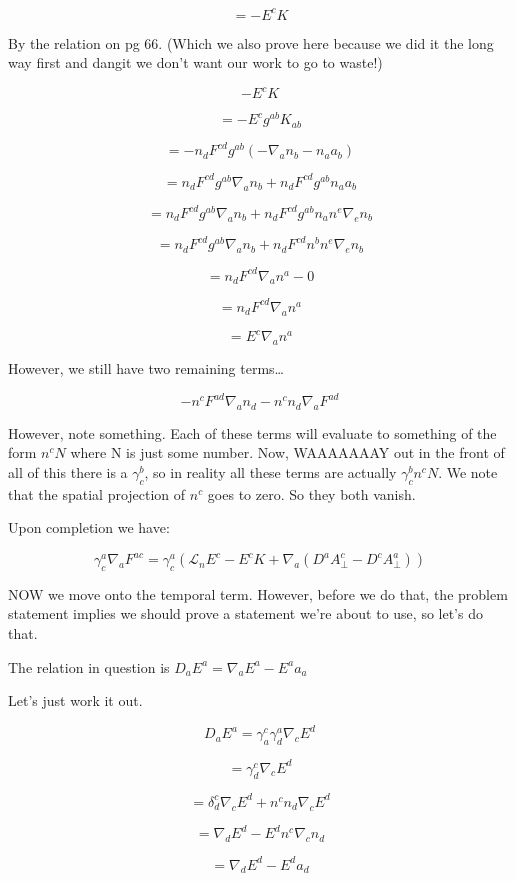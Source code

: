 \documentclass[landscape,letterpaper,10pt,english]{article}
\begin{document}
\[ = - E^c K \]

By the relation on pg 66. (Which we also prove here because we did it
the long way first and dangit we don't want our work to go to waste!)

\[ -E^c K \]

\[ = -E^c g^{ab} K_{ab} \]

\[ = -n_d F^{cd} g^{ab} (-\nabla_a n_b - n_a a_b) \]

\[ = n_d F^{cd} g^{ab} \nabla_a n_b + n_d F^{cd} g^{ab} n_a a_b \]

\[ = n_d F^{cd} g^{ab} \nabla_a n_b + n_d F^{cd} g^{ab} n_a n^e \nabla_e n_b \]

\[ = n_d F^{cd} g^{ab} \nabla_a n_b + n_d F^{cd} n^b n^e \nabla_e n_b \]

\[ = n_d F^{cd} \nabla_a n^a - 0 \]

\[ = n_d F^{cd} \nabla_a n^a  \]

\[ = E^c \nabla_a n^a \]

    However, we still have two remaining terms\ldots{}

\[ - n^c F^{ad} \nabla_a n_d - n^c n_d \nabla_a F^{ad} \]

However, note something. Each of these terms will evaluate to something
of the form \(n^c N\) where N is just some number. Now, WAAAAAAAY out in
the front of all of this there is a \(\gamma^b_c\), so in reality all
these terms are actually \(\gamma^b_c n^c N\). We note that the spatial
projection of \(n^c\) goes to zero. So they both vanish.

    Upon completion we have:

\[\gamma^a_c \nabla_a F^{ac} = \gamma^a_c (\mathcal{L}_n E^c - E^c K + \nabla_a (D^a A^c_\perp - D^c A^a_\perp))\]

NOW we move onto the temporal term. However, before we do that, the
problem statement implies we should prove a statement we're about to
use, so let's do that.

    The relation in question is \(D_a E^a = \nabla_a E^a - E^a a_a\)

Let's just work it out.

\[ D_a E^a = \gamma^c_a \gamma^a_d \nabla_c E^d \]

\[ = \gamma^c_d \nabla_c E^d \]

\[ = \delta^c_d \nabla_c E^d + n^c n_d \nabla_c E^d \]

\[ = \nabla_d E^d - E^d n^c \nabla_c n_d \]

\[ = \nabla_dE^d- E^d a_d \]
\end{document}
